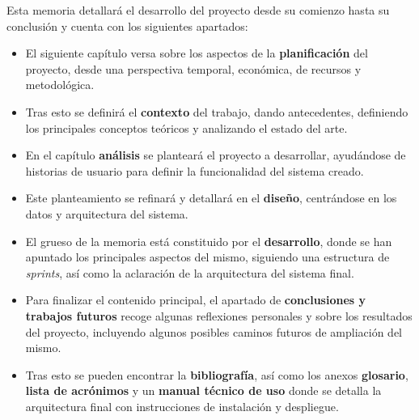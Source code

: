 Esta memoria detallará el desarrollo del proyecto desde su comienzo hasta su conclusión y cuenta con los siguientes apartados:
\begin{itemize}
	\item El siguiente capítulo versa sobre los aspectos de la \textbf{planificación} del proyecto, desde una perspectiva temporal, económica, de recursos y metodológica.
	\item Tras esto se definirá el \textbf{contexto} del trabajo, dando antecedentes, definiendo los principales conceptos teóricos y analizando el estado del arte.
	\item En el capítulo \textbf{análisis} se planteará el proyecto a desarrollar, ayudándose de historias de usuario para definir la funcionalidad del sistema creado.
	\item Este planteamiento se refinará y detallará en el \textbf{diseño}, centrándose en los datos y arquitectura del sistema.
	\item El grueso de la memoria está constituido por el \textbf{desarrollo}, donde se han apuntado los principales aspectos del mismo, siguiendo una estructura de \textit{sprints}, así como la aclaración de la arquitectura del sistema final.
	\item Para finalizar el contenido principal, el apartado de \textbf{conclusiones y trabajos futuros} recoge algunas reflexiones personales y sobre los resultados del proyecto, incluyendo algunos posibles caminos futuros de ampliación del mismo.
	\item Tras esto se pueden encontrar la \textbf{bibliografía}, así como los anexos \textbf{glosario}, \textbf{lista de acrónimos} y un \textbf{manual técnico de uso} donde se detalla la arquitectura final con instrucciones de instalación y despliegue.
\end{itemize}


